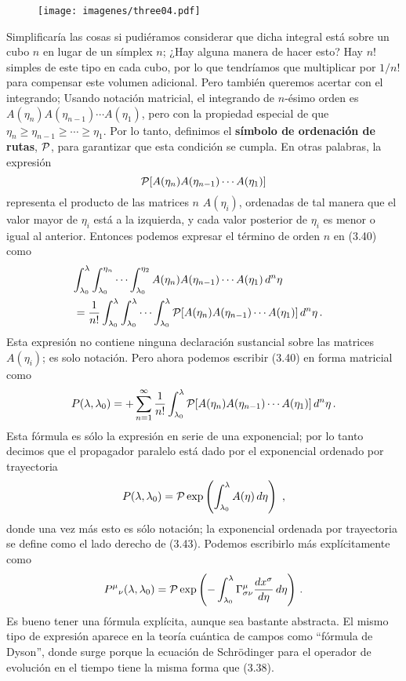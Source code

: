 \documentclass[11pt,b5paper,openany,twoside]{book}
\newcommand*{\bigone}{\text{\usefont{U}{bbold}{m}{n}1}}
\let\bigone\relax
\newcommand*{\bigone}{\text{\usefont{U}{bbold}{m}{n}1}}
\begin{document}
\begin{figure}[h]
\centering
\texttt{[image: imagenes/three04.pdf]}
\end{figure}

Simplificaría las cosas si pudiéramos considerar que dicha integral está sobre un cubo $n$ en lugar de un símplex $n$; ¿Hay alguna manera de hacer esto? Hay $n!$ simples de este tipo en cada cubo, por lo que tendríamos que multiplicar por $1/n!$ para compensar este volumen adicional.
Pero también queremos acertar con el integrando; Usando notación matricial, el integrando de $n$-ésimo orden es $A(\eta_n)A(\eta_{n-1})\cdots A(\eta_1)$, pero con la propiedad especial de que $\eta_n\geq \eta_{n-1}\geq \cdots \geq \eta_1$.
Por lo tanto, definimos el {\bf símbolo de ordenación de rutas}, ${\cal P}$, para garantizar que esta condición se cumpla.
En otras palabras, la expresión
\begin{equation}
{\cal P}[A(\eta_n)A(\eta_{n-1})\cdots A(\eta_1)]\label{3.41}
\end{equation}
representa el producto de las matrices $n$ $A(\eta_i)$, ordenadas de tal manera que el valor mayor de $\eta_i$ está a la izquierda, y cada valor posterior de $\eta_i$ es menor o igual al anterior.
Entonces podemos expresar el término de orden $n$ en (3.40) como
\begin{align}
\lefteqn{\int^\lambda_{\lambda_0}\int^{\eta_n}_{\lambda_0}\cdots
\int^{\eta_2}_{\lambda_0} A(\eta_n) A(\eta_{n-1})\cdots
A(\eta_1)\, d^n\eta}  \notag \\
&=  {1\over{n!}}\int^\lambda_{\lambda_0}
\int^\lambda_{\lambda_0}\cdots\int^\lambda_{\lambda_0}
{\cal P}[A(\eta_n) A(\eta_{n-1})\cdots A(\eta_1)]\, d^n\eta\,.
\label{3.42}
\end{align}
Esta expresión no contiene ninguna declaración sustancial sobre las matrices $A(\eta_i)$; es solo notación.
Pero ahora podemos escribir (3.40) en forma matricial como
\begin{equation}
P(\lambda,\lambda_0) =  \bigone  + \sum^\infty_{n=1}{1\over {n!}}
\int^\lambda_{\lambda_0} {\cal P}[A(\eta_n) A(\eta_{n-1})\cdots
A(\eta_1)]\, d^n\eta\,.\label{3.43}
\end{equation}
Esta fórmula es sólo la expresión en serie de una exponencial; por lo tanto decimos que el propagador paralelo está dado por el exponencial ordenado por trayectoria
\begin{equation}
P(\lambda,\lambda_0) = {\cal P}\exp\left(\int^\lambda_{\lambda_0}
A(\eta)\, d\eta\right)\ ,\label{3.44}
\end{equation}
donde una vez más esto es sólo notación; la exponencial ordenada por trayectoria se define como el lado derecho de (3.43).
Podemos escribirlo más explícitamente como
\begin{equation}
P^\mu{}_\nu(\lambda,\lambda_0) ={\cal P}\exp\left(-
\int^\lambda_{\lambda_0}\Gamma^\mu_{\sigma\nu}{{dx^\sigma}\over
{d\eta}}\, d\eta\right)\,.\label{3.45}
\end{equation}
Es bueno tener una fórmula explícita, aunque sea bastante abstracta.
El mismo tipo de expresión aparece en la teoría cuántica de campos como ``fórmula de Dyson'', donde surge porque la ecuación de Schrödinger para el operador de evolución en el tiempo tiene la misma forma que (3.38).
\end{document}
